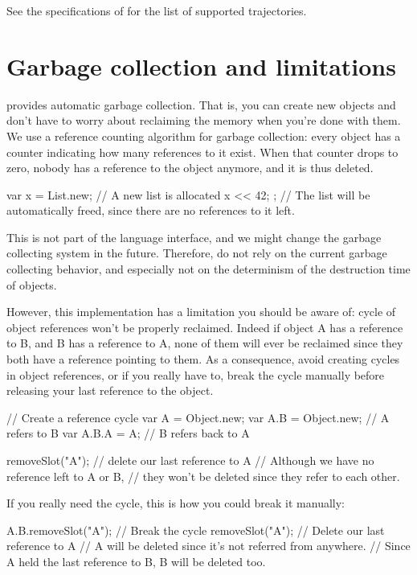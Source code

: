 
See the specifications of  for the list
of supported trajectories.

\section{Garbage collection and limitations}
\label{sec:lang:gc}

\us provides automatic garbage collection. That is, you can create new
objects and don't have to worry about reclaiming the memory when you're done
with them. We use a reference counting algorithm for garbage collection:
every object has a counter indicating how many references to it
exist. When that counter drops to zero, nobody has a reference to the object
anymore, and it is thus deleted.

\begin{urbiunchecked}
{
  var x = List.new; // A new list is allocated
  x << 42;
};
// The list will be automatically freed, since there are no references to it left.
\end{urbiunchecked}

This is not part of the language interface, and we might change the garbage
collecting system in the future. Therefore, do not rely on the current
garbage collecting behavior, and especially not on the determinism of the
destruction time of objects.

However, this implementation has a limitation you should be aware of: cycle
of object references won't be properly reclaimed. Indeed if object A has a
reference to B, and B has a reference to A, none of them will ever be
reclaimed since they both have a reference pointing to them. As a
consequence, avoid creating cycles in object references, or if you really
have to, break the cycle manually before releasing your last reference to
the object.

\begin{urbiunchecked}
// Create a reference cycle
var A = Object.new;
var A.B = Object.new; // A refers to B
var A.B.A = A; // B refers back to A

removeSlot("A"); // delete our last reference to A
// Although we have no reference left to A or B,
// they won't be deleted since they refer to each other.
\end{urbiunchecked}

If you really need the cycle, this is how you could break it manually:

\begin{urbiunchecked}
A.B.removeSlot("A"); // Break the cycle
removeSlot("A"); // Delete our last reference to A
// A will be deleted since it's not referred from anywhere.
// Since A held the last reference to B, B will be deleted too.
\end{urbiunchecked}

